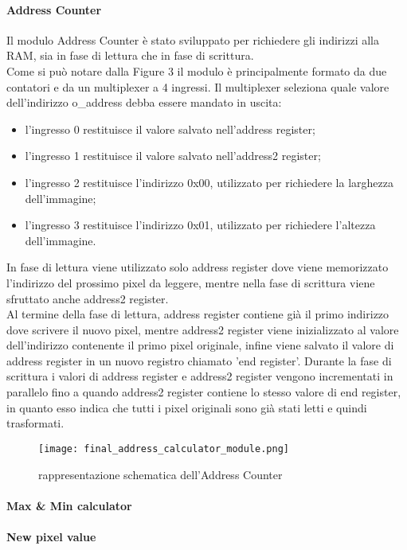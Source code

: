 \paragraph{Address Counter\\}

Il modulo Address Counter è stato sviluppato per richiedere gli indirizzi alla RAM, sia in fase di lettura che in fase di scrittura.\\
Come si può notare dalla Figure 3 il modulo è principalmente formato da due contatori e da un multiplexer a 4 ingressi. Il multiplexer seleziona quale valore dell'indirizzo o\_address debba essere mandato in uscita:
\begin{itemize}
    \item l'ingresso 0 restituisce il valore salvato nell'address register;
    \item l'ingresso 1 restituisce il valore salvato nell'address2 register;
    \item l'ingresso 2 restituisce l'indirizzo 0x00, utilizzato per richiedere la larghezza dell'immagine;
    \item l'ingresso 3 restituisce l'indirizzo 0x01, utilizzato per richiedere l'altezza dell'immagine.
\end{itemize}
In fase di lettura viene utilizzato solo address register dove viene memorizzato l'indirizzo del prossimo pixel da leggere, mentre nella fase di scrittura viene sfruttato anche address2 register.\\
Al termine della fase di lettura, address register contiene già il primo indirizzo dove scrivere il nuovo pixel, mentre address2 register viene inizializzato al valore dell'indirizzo contenente il primo pixel originale, infine viene salvato il valore di address register in un nuovo registro chiamato 'end register'.
Durante la fase di scrittura i valori di address register e address2 register vengono incrementati in parallelo fino a quando address2 register contiene lo stesso valore di end register, in quanto esso indica che tutti i pixel originali sono già stati letti e quindi trasformati.

\begin{figure}[h]
\caption{rappresentazione schematica dell'Address Counter}
\centering
\texttt{[image: final\_address\_calculator\_module.png]}%
\end{figure}


\paragraph{Max \& Min calculator}
\paragraph{New pixel value}
